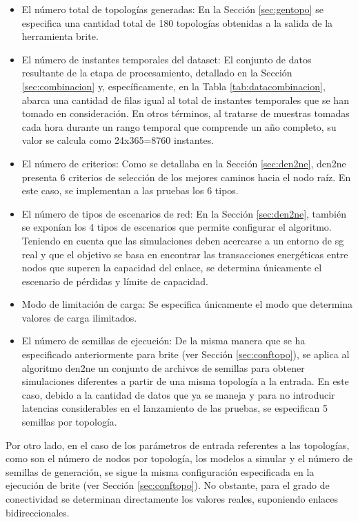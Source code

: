 \begin{itemize}
    \item El número total de topologías generadas: En la Sección \ref{sec:gentopo} se especifica una cantidad total de 180 topologías obtenidas a la salida de la herramienta \gls{brite}.
    \item El número de instantes temporales del dataset: El conjunto de datos resultante de la etapa de procesamiento, detallado en la Sección \ref{sec:combinacion} y, específicamente, en la Tabla \ref{tab:datacombinacion}, abarca una cantidad de filas igual al total de instantes temporales que se han tomado en consideración. En otros términos, al tratarse de muestras tomadas cada hora durante un rango temporal que comprende un año completo, su valor se calcula como 24x365=8760 instantes.
    \item El número de criterios: Como se detallaba en la Sección \ref{sec:den2ne}, \gls{den2ne} presenta 6 criterios de selección de los mejores caminos hacia el nodo raíz. En este caso, se implementan a las pruebas los 6 tipos.
    \item El número de tipos de escenarios de red: En la Sección \ref{sec:den2ne}, también se exponían los 4 tipos de escenarios que permite configurar el algoritmo. Teniendo en cuenta que las simulaciones deben acercarse a un entorno de \gls{sg} real y que el objetivo se basa en encontrar las transacciones energéticas entre nodos que superen la capacidad del enlace, se determina únicamente el escenario de pérdidas y límite de capacidad.
    \item Modo de limitación de carga: Se especifica únicamente el modo que determina valores de carga ilimitados.
    \item El número de semillas de ejecución: De la misma manera que se ha especificado anteriormente para \gls{brite} (ver Sección \ref{sec:conftopo}), se aplica al algoritmo \gls{den2ne} un conjunto de archivos de semillas para obtener simulaciones diferentes a partir de una misma topología a la entrada. En este caso, debido a la cantidad de datos que ya se maneja y para no introducir latencias considerables en el lanzamiento de las pruebas, se especifican 5 semillas por topología.
\end{itemize}

Por otro lado, en el caso de los parámetros de entrada referentes a las topologías, como son el número de nodos por topología, los modelos a simular y el número de semillas de generación, se sigue la misma configuración especificada en la ejecución de \gls{brite} (ver Sección \ref{sec:conftopo}). No obstante, para el grado de conectividad se determinan directamente los valores reales, suponiendo enlaces bidireccionales.

